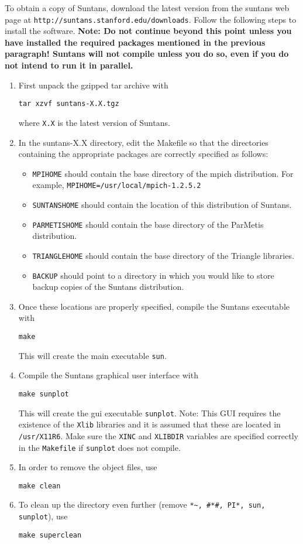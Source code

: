 \documentclass[12pt,oneside]{article}
\begin{document}
To obtain a copy of Suntans, download the latest version from the suntans
web page at \verb+http://suntans.stanford.edu/downloads+.  Follow the following
steps to install the software.  {\bf Note: Do not continue beyond this point unless
you have installed the required packages mentioned in the previous paragraph!
Suntans will not compile unless you do so, even if you do not intend to run it in
parallel.}
\begin{enumerate}
\item First unpack the gzipped tar archive with
\begin{verbatim}
tar xzvf suntans-X.X.tgz
\end{verbatim}
where \verb+X.X+ is the latest version of Suntans.  
\item In the suntans-X.X directory, edit the Makefile so that the directories containing the appropriate packages
are correctly specified as follows:
\begin{itemize}
\item \verb+MPIHOME+ should contain the base directory of the mpich distribution.
For example, 
\verb+MPIHOME=/usr/local/mpich-1.2.5.2+
\item \verb+SUNTANSHOME+ should contain the location of this distribution of Suntans.
\item \verb+PARMETISHOME+ should contain the base directory of the ParMetis distribution.
\item \verb+TRIANGLEHOME+ should contain the base directory of the Triangle libraries.
\item \verb+BACKUP+ should point to a directory in which you would like to store backup
copies of the Suntans distribution.
\end{itemize}
\item Once these locations are properly specified, compile the Suntans executable with
\begin{verbatim}
make
\end{verbatim}
This will create the main executable \verb+sun+.
\item Compile the Suntans graphical user interface with
\begin{verbatim}
make sunplot
\end{verbatim}
This will create the gui executable \verb+sunplot+.  Note:  This GUI requires the
existence of the \verb+Xlib+ libraries and it is assumed that these are located
in \verb+/usr/X11R6+.  Make sure the \verb+XINC+ and \verb+XLIBDIR+ variables
are specified correctly in the \verb+Makefile+ if \verb+sunplot+ does not compile.
\item In order to remove the object files, use
\begin{verbatim}
make clean
\end{verbatim}
\item To clean up the directory even further (remove \verb+*~, #*#, PI*, sun, sunplot+),
use
\begin{verbatim}
make superclean
\end{verbatim}
\end{enumerate}
\end{document}
